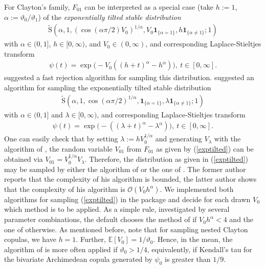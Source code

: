 \documentclass[nojss,article]{jss}
\theoremstyle{mythmstyle}
\newcommand*{\I}{\mathbf{1}}
\newcommand*{\IE}{\mathbb{E}}
\newcommand*{\tS}{\operatorname*{\tilde{S}}}
\newcommand*{\vt}{\vartheta}
\renewcommand*{\O}{\mathcal{O}}
\begin{document}
For Clayton's family, $F_{01}$ can be interpreted as a special case (take
$h:=1$, $\alpha:=\vt_0/\vt_1$) of the \textit{exponentially tilted stable
  distribution}
\begin{align}
  \tS(\alpha,1,(\cos(\alpha\pi/2)V_0)^{1/\alpha},V_0\I_{\{\alpha=1\}},h\I_{\{\alpha\neq1\}};1)\label{exptilted}
\end{align}
with $\alpha\in(0,1]$, $h\in[0,\infty)$, and $V_0\in(0,\infty)$, and
corresponding Laplace-Stieltjes transform
\begin{align*}
  \psi(t)=\exp\bigl(-V_0((h+t)^{\alpha}-h^{\alpha})\bigr),\ t\in[0,\infty].
\end{align*}
\citet{hofert2010a} suggested a fast rejection algorithm for sampling this
distribution. \citet{devroye2009} suggested an algorithm for
sampling the exponentially tilted stable distribution
\begin{align*}
  \tS(\alpha,1,\cos(\alpha\pi/2)^{1/\alpha},\I_{\{\alpha=1\}},\lambda\I_{\{\alpha\neq1\}};1)
\end{align*}
with $\alpha\in(0,1]$ and $\lambda\in[0,\infty)$, and corresponding
Laplace-Stieltjes transform
\begin{align*}
  \psi(t)=\exp\bigl(-((\lambda+t)^{\alpha}-\lambda^{\alpha})\bigr),\ t\in[0,\infty].
\end{align*}
One can easily check that by setting $\lambda:=hV_0^{1/\alpha}$ and
generating $V_\lambda$ with the algorithm of \citet{devroye2009}, the
random variable $V_{01}$ from $F_{01}$ as given by (\ref{exptilted}) can be
obtained via $V_{01}=V_0^{1/\alpha}V_\lambda$. Therefore, the distribution as
given in (\ref{exptilted}) may be sampled by either the algorithm of
\citet{devroye2009} or the one of \citet{hofert2010a}. The former
author reports that the complexity of his algorithm is bounded, the latter
author shows that the complexity of his algorithm is $\O(V_{0}h^{\alpha})$.
We implemented both algorithms for sampling (\ref{exptilted}) in the package
 and decide for each drawn $V_0$ which method is to be
applied. As a simple rule, investigated by several parameter combinations,
the default chooses the method of \citet{hofert2010a} if
$V_{0}h^{\alpha}<4$ and the one of \citet{devroye2009} otherwise. As
mentioned before, note that for sampling nested Clayton copulas, we have
$h=1$. Further, $\IE[V_0]=1/\vt_0$. Hence, in the mean, the algorithm of
\citet{hofert2010a} is more often applied if $\vt_0>1/4$,
equivalently, if Kendall's tau for the bivariate Archimedean copula
generated by $\psi_0$ is greater than $1/9$.
\end{document}
